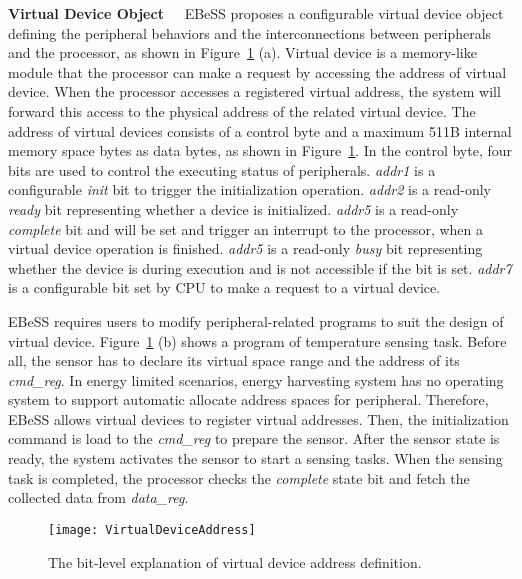\textbf{Virtual Device Object\ \ }
EBeSS proposes a configurable virtual device object defining the peripheral behaviors and the interconnections between peripherals and the processor, as shown in Figure~\ref{fig:VirtualDevice} (a).
Virtual device is a memory-like module that the processor can make a request by accessing the address of virtual device. 
When the processor accesses a registered virtual address, the system will forward this access to the physical address of the related virtual device.
The address of virtual devices consists of a control byte and a maximum 511B internal memory space bytes as data bytes, as shown in Figure~\ref{fig:VirtualDevice}.
In the control byte, four bits are used to control the executing status of peripherals.
\emph{addr1} is a configurable \emph{init} bit to trigger the initialization operation.
\emph{addr2} is a read-only \emph{ready} bit representing whether a device is initialized.
\emph{addr5} is a read-only \emph{complete} bit and will be set and trigger an interrupt to the processor, when a virtual device operation is finished.
\emph{addr5} is a read-only \emph{busy} bit representing whether the device is during execution and is not accessible if the bit is set.
\emph{addr7} is a configurable bit set by CPU to make a request to a virtual device.

EBeSS requires users to modify peripheral-related programs to suit the design of virtual device.
Figure~\ref{fig:VirtualDevice} (b) shows a program of temperature sensing task. 
Before all, the sensor has to declare its virtual space range and the address of its \emph{cmd\_reg}. 
In energy limited scenarios, energy harvesting system has no operating system to support automatic allocate address spaces for peripheral.
Therefore, EBeSS allows virtual devices to register virtual addresses.
Then, the initialization command is load to the \emph{cmd\_reg} to prepare the sensor.
After the sensor state is ready, the system activates the sensor to start a sensing tasks.
When the sensing task is completed, the processor checks the \emph{complete} state bit and fetch the collected data from \emph{data\_reg}.

\begin{figure}[!htpb]
	\centering
	\vspace{-5pt}
	\texttt{[image: VirtualDeviceAddress]}
	\vspace{-5pt}
	\caption{The bit-level explanation of virtual device address definition.}	\label{fig:VirtualDevice}
\end{figure}

